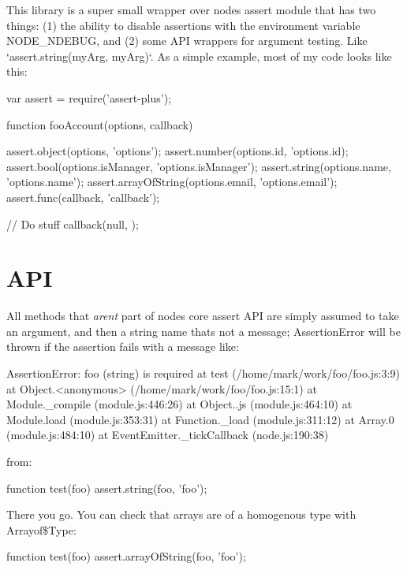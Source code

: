 This library is a super small wrapper over node\textquotesingle{}s assert module that has two things\+: (1) the ability to disable assertions with the environment variable N\+O\+D\+E\+\_\+\+N\+D\+E\+B\+U\+G, and (2) some A\+P\+I wrappers for argument testing. Like `assert.string(my\+Arg, \textquotesingle{}my\+Arg\textquotesingle{})`. As a simple example, most of my code looks like this\+: \begin{DoxyVerb}var assert = require('assert-plus');

function fooAccount(options, callback) {
    assert.object(options, 'options');
    assert.number(options.id, 'options.id);
    assert.bool(options.isManager, 'options.isManager');
    assert.string(options.name, 'options.name');
    assert.arrayOfString(options.email, 'options.email');
    assert.func(callback, 'callback');

    // Do stuff
    callback(null, {});
}
\end{DoxyVerb}


\section*{A\+P\+I}

All methods that {\itshape aren\textquotesingle{}t} part of node\textquotesingle{}s core assert A\+P\+I are simply assumed to take an argument, and then a string \textquotesingle{}name\textquotesingle{} that\textquotesingle{}s not a message; {\ttfamily Assertion\+Error} will be thrown if the assertion fails with a message like\+: \begin{DoxyVerb}AssertionError: foo (string) is required
at test (/home/mark/work/foo/foo.js:3:9)
at Object.<anonymous> (/home/mark/work/foo/foo.js:15:1)
at Module._compile (module.js:446:26)
at Object..js (module.js:464:10)
at Module.load (module.js:353:31)
at Function._load (module.js:311:12)
at Array.0 (module.js:484:10)
at EventEmitter._tickCallback (node.js:190:38)
\end{DoxyVerb}


from\+: \begin{DoxyVerb}function test(foo) {
    assert.string(foo, 'foo');
}
\end{DoxyVerb}


There you go. You can check that arrays are of a homogenous type with {\ttfamily Arrayof\$\+Type}\+: \begin{DoxyVerb}function test(foo) {
    assert.arrayOfString(foo, 'foo');
}
\end{DoxyVerb}


